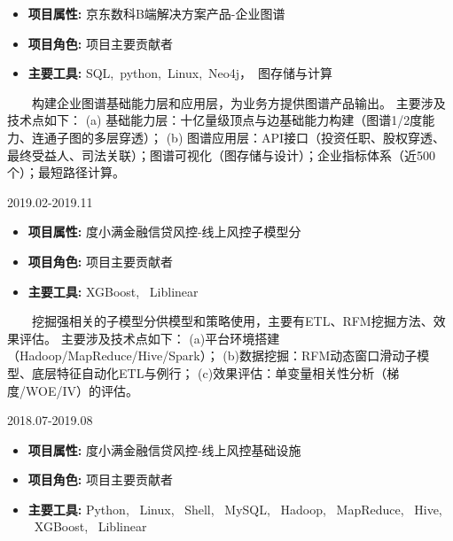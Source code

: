\documentclass{resume}
\begin{document}
{{\begin{itemize}  [parsep=0.5ex]
  \item   \textbf{  项目属性:  }   {  京东数科B端解决方案产品-企业图谱  }                
  \item   \textbf{  项目角色:  }   {  项目主要贡献者  }
  \item   \textbf{  主要工具:  }   {  SQL,\ python,\ Linux,\ Neo4j，\ 图存储与计算 }

\end{itemize}


{    \ \ \ \ 构建企业图谱基础能力层和应用层，为业务方提供图谱产品输出。
主要涉及技术点如下：
(a) 基础能力层：十亿量级顶点与边基础能力构建（图谱1/2度能力、连通子图的多层穿透）；
(b) 图谱应用层：API接口（投资任职、股权穿透、最终受益人、司法关联）；图谱可视化（图存储与设计）；企业指标体系（近500个）；最短路径计算。 }

\medskip










                      {2019.02-2019.11}

\begin{itemize}  [parsep=0.5ex]

  \item   \textbf{  项目属性:  }   {  度小满金融信贷风控-线上风控子模型分  }                
  \item   \textbf{  项目角色:  }   {  项目主要贡献者  }
  \item   \textbf{  主要工具:  }   {  XGBoost, \ Liblinear  }

\end{itemize}


{    \ \ \ \ 挖掘强相关的子模型分供模型和策略使用，主要有ETL、RFM挖掘方法、效果评估。
主要涉及技术点如下：
(a)平台环境搭建（Hadoop/MapReduce/Hive/Spark）；
(b)数据挖掘：RFM动态窗口滑动子模型、底层特征自动化ETL与例行；
(c)效果评估：单变量相关性分析（梯度/WOE/IV）的评估。}

\medskip










                             {2018.07-2019.08}

\begin{itemize} [parsep=0.5ex]

\item   \textbf{  项目属性:  }  {  度小满金融信贷风控-线上风控基础设施  }
\item   \textbf{  项目角色:  }  {  项目主要贡献者  }
\item   \textbf{  主要工具:  }  {  Python, \ Linux, \ Shell, \ MySQL, \ Hadoop, \ MapReduce, \ Hive, \ XGBoost, \ Liblinear  }


\end{itemize}}}
\end{document}
